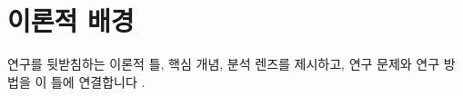 \section{이론적 배경}\label{sec:framework-kr}


연구를 뒷받침하는 이론적 틀, 핵심 개념, 분석 렌즈를 제시하고, 연구 문제와 연구
방법을 이 틀에 연결합니다 \citep{examplebook2020}.
